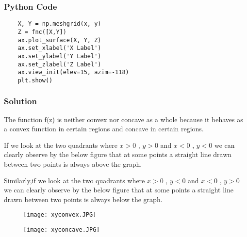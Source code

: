 \documentclass{beamer}
\begin{document}
\begin{frame}[fragile] %
\frametitle{Python Code}
\begin{example}
\begin{verbatim} 
    X, Y = np.meshgrid(x, y)
    Z = fnc([X,Y])
    ax.plot_surface(X, Y, Z)
    ax.set_xlabel('X Label')
    ax.set_ylabel('Y Label')
    ax.set_zlabel('Z Label')
    ax.view_init(elev=15, azim=-118)
    plt.show()
\end{verbatim}
\end{example}
\end{frame}



\begin{frame}
\frametitle{Solution}

The function f(z) is neither convex nor concave as a whole because it behaves as a convex function in certain regions and concave in certain regions.\newline

If we look at the two quadrants where $x>0$ , $y>0$ and $x<0$ , $y<0$ we can clearly observe by the below figure that at some points a straight line drawn between two points is always above the graph.\newline

Similarly,if we look at the two quadrants where $x>0$ , $y<0$ and $x<0$ , $y>0$ we can clearly observe by the below figure that at some points a straight line drawn between two points is always below the graph.



\end{frame}


\begin{frame}

\begin{figure}
\texttt{[image: xyconvex.JPG]}
\end{figure}
    
\end{frame}
\begin{frame}

\begin{figure}
\texttt{[image: xyconcave.JPG]}
\end{figure}
    
\end{frame}
\end{document}
